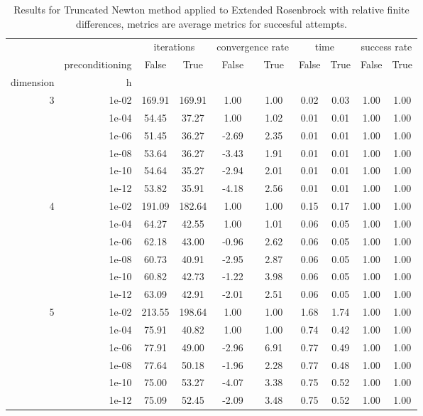\begin{table}
\centering
\caption{Results for Truncated Newton method applied to Extended Rosenbrock with relative finite differences, metrics are average metrics for succesful attempts.}
\label{tab:Truncated_Newton_Extended_Rosenbrock_fd_rel}
\begin{tabular}{rr|cc|cc|cc|cc}
\toprule
    &  & \multicolumn{2}{|c}{iterations} & \multicolumn{2}{|c}{convergence rate} & \multicolumn{2}{|c}{time} & \multicolumn{2}{|c}{success rate} \\
    & preconditioning & False & True & False & True & False & True & False & True \\
dimension & h &  &  &  &  &  &  &  &  \\
\midrule
\multirow[t]{6}{*}{3} & 1e-02 & 169.91 & 169.91 & 1.00 & 1.00 & 0.02 & 0.03 & 1.00 & 1.00 \\
    & 1e-04 & 54.45 & 37.27 & 1.00 & 1.02 & 0.01 & 0.01 & 1.00 & 1.00 \\
    & 1e-06 & 51.45 & 36.27 & -2.69 & 2.35 & 0.01 & 0.01 & 1.00 & 1.00 \\
    & 1e-08 & 53.64 & 36.27 & -3.43 & 1.91 & 0.01 & 0.01 & 1.00 & 1.00 \\
    & 1e-10 & 54.64 & 35.27 & -2.94 & 2.01 & 0.01 & 0.01 & 1.00 & 1.00 \\
    & 1e-12 & 53.82 & 35.91 & -4.18 & 2.56 & 0.01 & 0.01 & 1.00 & 1.00 \\
\cline{1-10}
\multirow[t]{6}{*}{4} & 1e-02 & 191.09 & 182.64 & 1.00 & 1.00 & 0.15 & 0.17 & 1.00 & 1.00 \\
    & 1e-04 & 64.27 & 42.55 & 1.00 & 1.01 & 0.06 & 0.05 & 1.00 & 1.00 \\
    & 1e-06 & 62.18 & 43.00 & -0.96 & 2.62 & 0.06 & 0.05 & 1.00 & 1.00 \\
    & 1e-08 & 60.73 & 40.91 & -2.95 & 2.87 & 0.06 & 0.05 & 1.00 & 1.00 \\
    & 1e-10 & 60.82 & 42.73 & -1.22 & 3.98 & 0.06 & 0.05 & 1.00 & 1.00 \\
    & 1e-12 & 63.09 & 42.91 & -2.01 & 2.51 & 0.06 & 0.05 & 1.00 & 1.00 \\
\cline{1-10}
\multirow[t]{6}{*}{5} & 1e-02 & 213.55 & 198.64 & 1.00 & 1.00 & 1.68 & 1.74 & 1.00 & 1.00 \\
    & 1e-04 & 75.91 & 40.82 & 1.00 & 1.00 & 0.74 & 0.42 & 1.00 & 1.00 \\
    & 1e-06 & 77.91 & 49.00 & -2.96 & 6.91 & 0.77 & 0.49 & 1.00 & 1.00 \\
    & 1e-08 & 77.64 & 50.18 & -1.96 & 2.28 & 0.77 & 0.48 & 1.00 & 1.00 \\
    & 1e-10 & 75.00 & 53.27 & -4.07 & 3.38 & 0.75 & 0.52 & 1.00 & 1.00 \\
    & 1e-12 & 75.09 & 52.45 & -2.09 & 3.48 & 0.75 & 0.52 & 1.00 & 1.00 \\
\cline{1-10}
\bottomrule
\end{tabular}
\end{table}
